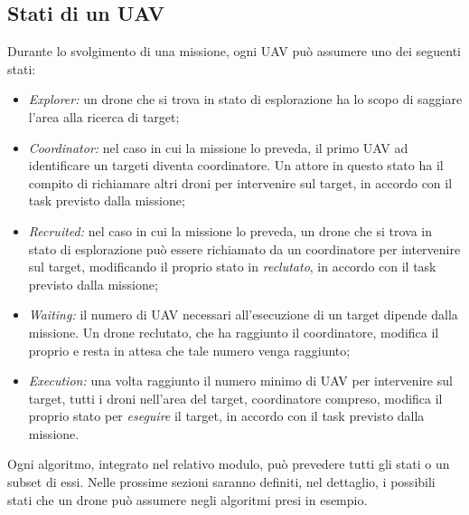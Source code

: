 \subsection{Stati di un UAV} \label{stati}

Durante lo svolgimento di una missione, ogni UAV può assumere uno dei seguenti stati:

\begin{itemize}
    \item \textit{Explorer:} un drone che si trova in stato di esplorazione ha lo scopo di saggiare l'area alla ricerca di target;
    \item \textit{Coordinator:} nel caso in cui la missione lo preveda, il primo UAV ad identificare un targeti diventa coordinatore. Un attore in questo stato ha il compito di richiamare altri droni per intervenire sul target, in accordo con il task previsto dalla missione;
    \item \textit{Recruited:} nel caso in cui la missione lo preveda, un drone che si trova in stato di esplorazione può essere richiamato da un coordinatore per intervenire sul target, modificando il proprio stato in \textit{reclutato}, in accordo con il task previsto dalla missione;
    \item \textit{Waiting:} il numero di UAV necessari all'esecuzione di un target dipende dalla missione. Un drone reclutato, che ha raggiunto il coordinatore, modifica il proprio e resta in attesa che tale numero venga raggiunto;
    \item \textit{Execution:} una volta raggiunto il numero minimo di UAV per intervenire sul target, tutti i droni nell'area del target, coordinatore compreso, modifica il proprio stato per \textit{eseguire} il target, in accordo con il task previsto dalla missione.
\end{itemize}

Ogni algoritmo, integrato nel relativo modulo, può prevedere tutti gli stati o un subset di essi.
Nelle prossime sezioni saranno definiti, nel dettaglio, i possibili stati che un drone può assumere negli algoritmi presi in esempio.


